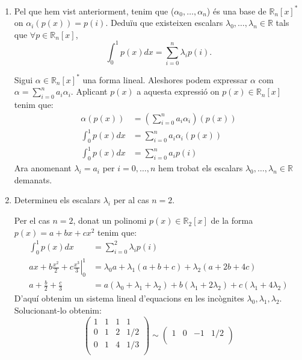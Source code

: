 \documentclass[11pt,a4paper]{article}
\begin{document}
\begin{enumerate}
\begin{enumerate}
\begin{enumerate}
            \item Pel que hem vist anteriorment, tenim que ($\alpha_0,\ldots,\alpha_n$) és una base de $\mathbb{R}_n[x]^*$ on $\alpha_i(p(x))=p(i)$. Deduïu que existeixen escalars $\lambda_0,\ldots,\lambda_n\in \mathbb{R}$ tals que $\forall p\in\mathbb{R}_n[x]$,$$\int_0^1 p(x)dx=\sum_{i=0}^n \lambda_ip(i).$$\par
            Sigui $\alpha\in \mathbb{R}_n[x]^*$ una forma lineal. Aleshores podem expressar $\alpha$ com $\alpha=\sum_{i=0}^na_i\alpha_i$. Aplicant $p(x)$ a aquesta expressió on $p(x)\in \mathbb{R}_n[x]$ tenim que:
            \begin{align*}
                \alpha(p(x))&=\left(\sum_{i=0}^na_i\alpha_i\right)(p(x))\\
                \int_0^1p(x)dx&=\sum_{i=0}^na_i\alpha_i(p(x))\\
                \int_0^1p(x)dx&=\sum_{i=0}^na_ip(i)
            \end{align*}
            Ara anomenant $\lambda_i=a_i$ per $i=0,\ldots,n$ hem trobat els escalars $\lambda_0,\ldots,\lambda_n\in \mathbb{R}$ demanats.
            \item Determineu els escalars $\lambda_i$ per al cas $n=2$.\par
            Per el cas $n=2$, donat un polinomi $p(x)\in \mathbb{R}_2[x]$ de la forma $p(x)=a+bx+cx^2$ tenim que:
            \begin{align*}
                \int_0^1p(x)dx&=\sum_{i=0}^2\lambda_ip(i)\\
                \left.ax+b\frac{x^2}{2}+c\frac{x^3}{3}\right\vert_0^1&=\lambda_0a+\lambda_1(a+b+c)+\lambda_2(a+2b+4c)\\
                a+\frac{b}{2}+\frac{c}{3}&=a(\lambda_0+\lambda_1+\lambda_2)+b(\lambda_1+2\lambda_2)+c(\lambda_1+4\lambda_2)
            \end{align*}
            D'aquí obtenim un sistema lineal d'equacions en les incògnites $\lambda_0,\lambda_1,\lambda_2$. Solucionant-lo obtenim:
            \begin{equation*}
                \begin{pmatrix}
                  1 & 1 & 1 & 1 \\
                  0 & 1 & 2 & 1/2 \\
                  0 & 1 & 4 & 1/3 \\
               \end{pmatrix}\sim\begin{pmatrix}
                  1 & 0 & -1 & 1/2 \\

\end{pmatrix}
\end{equation*}
\end{enumerate}
\end{enumerate}
\end{enumerate}
\end{document}
